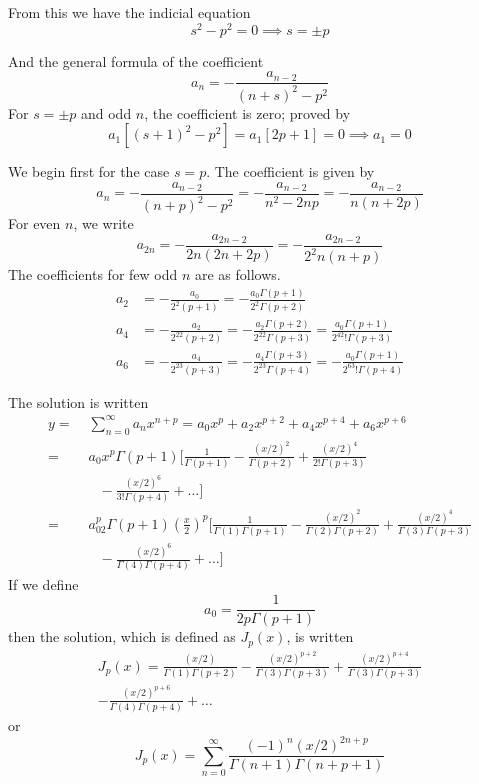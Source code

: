 \documentclass[../main.tex]{subfiles}
\begin{document}
From this we have the indicial equation
\begin{equation*}
    s^2-p^2=0\implies s=\pm p
\end{equation*}

And the general formula of the coefficient
\begin{equation*}
    a_n=-\frac{a_{n-2}}{(n+s)^2-p^2}
\end{equation*}
For $s=\pm p$ and odd $n$, the coefficient is zero; proved by 
\begin{equation*}
    a_1\left[(s+1)^2-p^2\right]=a_1\left[2p+1\right]=0\implies a_1=0 
\end{equation*} 

We begin first for the case $s=p$. The coefficient is given by 
\begin{equation*}
    a_n=-\frac{a_{n-2}}{(n+p)^2-p^2}=-\frac{a_{n-2}}{n^2-2np}=-\frac{a_{n-2}}{n(n+2p)}
\end{equation*}
For even $n$, we write
\begin{equation*}
    a_{2n}=-\frac{a_{2n-2}}{2n(2n+2p)}= -\frac{a_{2n-2}}{2^2n(n+p)}
\end{equation*}
The coefficients for few odd $n$ are as follows.
\begin{align*}
    a_2&=-\frac{a_0}{2^2(p+1)}=-\frac{a_0\Gamma(p+1)}{2^2\Gamma(p+2)}\\
    a_4&=-\frac{a_2}{2^22(p+2)}=-\frac{a_2\Gamma(p+2)}{2^22\Gamma(p+3)}=\frac{a_0\Gamma(p+1)}{2^42!\Gamma(p+3)}\\
    a_6&=-\frac{a_4}{2^23(p+3)}=-\frac{a_4\Gamma(p+3)}{2^23\Gamma(p+4)}=-\frac{a_0\Gamma(p+1)}{2^63!\Gamma(p+4)}
\end{align*}

The solution is written
\begin{align*}    
    y=&\;\sum_{n=0}^{\infty} a_nx^{n+p}=a_0x^p+a_2x^{p+2}+a_4 x^{p+4}+a_6x^{p+6}\\
    =&\;a_0x^p\Gamma(p+1)\bigg[\frac{1}{\Gamma(p+1)}- \frac{(x/2)^2}{\Gamma(p+2)}+\frac{(x/2)^4}{2!\Gamma(p+3)}\\
    &\quad- \frac{(x/2)^6}{3!\Gamma(p+4)}+\dots\bigg]\\
    =&\;a_02^p\Gamma(p+1)\left(\frac{x}{2}\right)^p\bigg[\frac{1}{\Gamma(1)\Gamma(p+1)}- \frac{(x/2)^2}{\Gamma(2)\Gamma(p+2)}+\frac{(x/2)^4}{\Gamma(3)\Gamma(p+3)}\\
    &\quad- \frac{(x/2)^6}{\Gamma(4)\Gamma(p+4)}+\dots\bigg]
\end{align*}
If we define 
\begin{equation*}
    a_0=\frac{1}{2p\Gamma(p+1)}
\end{equation*}
then the solution, which is defined as $J_p(x)$, is written
\begin{multline*}
    J_p(x)=\frac{(x/2)}{\Gamma(1)\Gamma(p+2)}-\frac{(x/2)^{p+2}}{\Gamma(3)\Gamma(p+3)} +\frac{(x/2)^{p+4}}{\Gamma(3)\Gamma(p+3)} \\
    -\frac{(x/2)^{p+6}}{\Gamma(4)\Gamma(p+4)} +\dots
\end{multline*}
or
\begin{equation*}
    J_p(x)=\sum_{n=0}^{\infty}\frac{(-1)^n(x/2)^{2n+p}}{\Gamma(n+1)\Gamma(n+p+1)}
\end{equation*}
\end{document}
